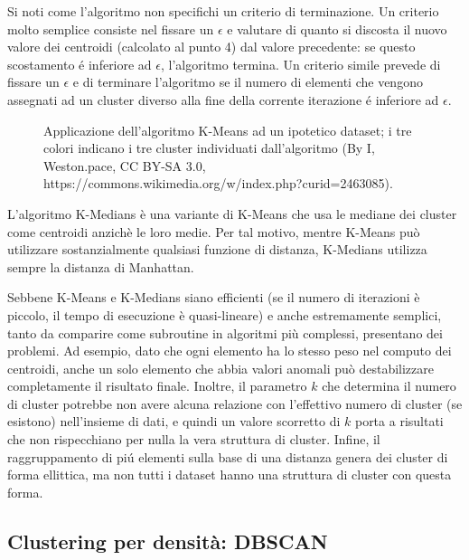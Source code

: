 \documentclass[12pt]{report}
\begin{document}
				Si noti come l'algoritmo non specifichi un criterio di terminazione. Un criterio
				molto semplice consiste nel fissare un $\epsilon$ e valutare di quanto
				si discosta il nuovo valore dei centroidi (calcolato al punto 4) dal
				valore precedente: se questo scostamento é inferiore ad $\epsilon$,
				l'algoritmo termina. Un criterio simile prevede di fissare un $\epsilon$
				e di terminare l'algoritmo se il numero di elementi che vengono assegnati
				ad un cluster diverso alla fine della corrente iterazione é inferiore ad
				$\epsilon$.

				\begin{figure}[H]
					\centering
					
					\caption{Applicazione dell'algoritmo K-Means ad un ipotetico dataset;
					i tre colori indicano i tre cluster individuati dall'algoritmo (By I,
					Weston.pace, CC BY-SA 3.0, https://commons.wikimedia.org/w/index.php?curid=2463085).}
					\label{fig:k-means-example}
				\end{figure}

				L'algoritmo K-Medians è una variante di K-Means che usa le mediane dei
				cluster come centroidi anzichè le loro medie. Per tal motivo, mentre
				K-Means può utilizzare sostanzialmente qualsiasi funzione di distanza,
				K-Medians utilizza sempre la distanza di Manhattan.

				Sebbene K-Means e K-Medians siano efficienti (se il numero di
				iterazioni è piccolo, il tempo di esecuzione è quasi-lineare) e
				anche estremamente semplici, tanto da comparire come subroutine
				in algoritmi più complessi, presentano dei problemi. Ad esempio,
				dato che ogni elemento ha lo stesso peso nel computo dei centroidi,
				anche un solo elemento che abbia valori anomali può destabilizzare
				completamente il risultato finale. Inoltre, il parametro $k$ che
				determina il numero di cluster potrebbe non avere alcuna relazione
				con l'effettivo numero di cluster (se esistono) nell'insieme di
				dati, e quindi un valore scorretto di $k$ porta a risultati che
				non rispecchiano per nulla la vera struttura di cluster. Infine,
				il raggruppamento di piú elementi sulla base di una distanza genera
				dei cluster di forma ellittica, ma non tutti i dataset hanno una
				struttura di cluster con questa forma.

			\subsection{Clustering per densità: DBSCAN}
\end{document}
